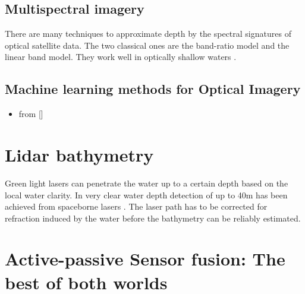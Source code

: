 \subsection{Multispectral imagery}

There are many techniques to approximate depth by the spectral signatures of optical satellite data. The two classical ones are the band-ratio model and the linear band model. They work well in optically shallow waters \parencite{Salameh2019}.

\subsection{Machine learning methods for Optical Imagery}

\begin{itemize}

      \item from {[}{]}
\end{itemize}


\section{Lidar bathymetry}

Green light lasers can penetrate the water up to a certain depth based on the local water clarity. In very clear water depth detection of up to 40m has been achieved from spaceborne lasers \parencite{Parrish2019}. The laser path has to be corrected for refraction induced by the water before the bathymetry can be reliably estimated.

\section{Active-passive Sensor fusion: The best of both worlds}


